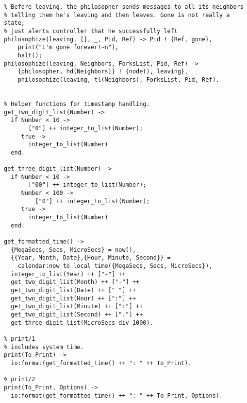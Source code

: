 \documentclass[11pt]{article}
\begin{document}
\begin{lstlisting}
% Before leaving, the philosopher sends messages to all its neighbors
% telling them he's leaving and then leaves. Gone is not really a state,
% just alerts controller that he successfully left
philosophize(leaving, [], _, Pid, Ref) -> Pid ! {Ref, gone},
    print("I'm gone forever!~n"),
    halt();
philosophize(leaving, Neighbors, ForksList, Pid, Ref) -> 
    {philosopher, hd(Neighbors)} ! {node(), leaving},
    philosophize(leaving, tl(Neighbors), ForksList, Pid, Ref).


% Helper functions for timestamp handling.
get_two_digit_list(Number) ->
  if Number < 10 ->
       ["0"] ++ integer_to_list(Number);
     true ->
       integer_to_list(Number)
  end.

get_three_digit_list(Number) ->
  if Number < 10 ->
       ["00"] ++ integer_to_list(Number);
     Number < 100 ->
         ["0"] ++ integer_to_list(Number);
     true ->
       integer_to_list(Number)
  end.

get_formatted_time() ->
  {MegaSecs, Secs, MicroSecs} = now(),
  {{Year, Month, Date},{Hour, Minute, Second}} =
    calendar:now_to_local_time({MegaSecs, Secs, MicroSecs}),
  integer_to_list(Year) ++ ["-"] ++
  get_two_digit_list(Month) ++ ["-"] ++
  get_two_digit_list(Date) ++ [" "] ++
  get_two_digit_list(Hour) ++ [":"] ++
  get_two_digit_list(Minute) ++ [":"] ++
  get_two_digit_list(Second) ++ ["."] ++
  get_three_digit_list(MicroSecs div 1000).

% print/1
% includes system time.
print(To_Print) ->
  io:format(get_formatted_time() ++ ": " ++ To_Print).

% print/2
print(To_Print, Options) ->
  io:format(get_formatted_time() ++ ": " ++ To_Print, Options).

\end{lstlisting}
\end{document}
